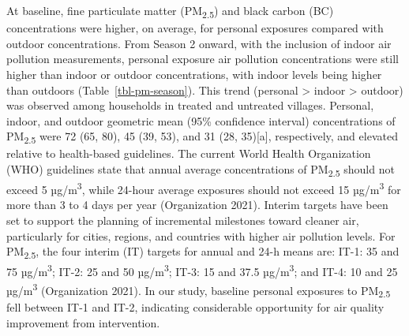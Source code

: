 \documentclass[
  letterpaper,
  DIV=11,
  numbers=noendperiod]{scrartcl}
\begin{document}
At baseline, fine particulate matter (PM\textsubscript{2.5}) and black
carbon (BC) concentrations were higher, on average, for personal
exposures compared with outdoor concentrations. From Season 2 onward,
with the inclusion of indoor air pollution measurements, personal
exposure air pollution concentrations were still higher than indoor or
outdoor concentrations, with indoor levels being higher than outdoors
(Table~\ref{tbl-pm-season}). This trend (personal \textgreater{} indoor
\textgreater{} outdoor) was observed among households in treated and
untreated villages. Personal, indoor, and outdoor geometric mean (95\%
confidence interval) concentrations of PM\textsubscript{2.5} were 72
(65, 80), 45 (39, 53), and 31 (28, 35){[}a{]}, respectively, and
elevated relative to health-based guidelines. The current World Health
Organization (WHO) guidelines state that annual average concentrations
of PM\textsubscript{2.5} should not exceed 5 µg/m\textsuperscript{3},
while 24-hour average exposures should not exceed 15
µg/m\textsuperscript{3} for more than 3 to 4 days per year (Organization
2021). Interim targets have been set to support the planning of
incremental milestones toward cleaner air, particularly for cities,
regions, and countries with higher air pollution levels. For
PM\textsubscript{2.5}, the four interim (IT) targets for annual and 24-h
means are: IT-1: 35 and 75 µg/m\textsuperscript{3}; IT-2: 25 and 50
µg/m\textsuperscript{3}; IT-3: 15 and 37.5 µg/m\textsuperscript{3}; and
IT-4: 10 and 25 µg/m\textsuperscript{3} (Organization 2021). In our
study, baseline personal exposures to PM\textsubscript{2.5} fell between
IT-1 and IT-2, indicating considerable opportunity for air quality
improvement from intervention.
\end{document}
